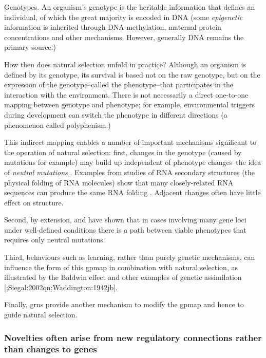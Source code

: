 Genotypes. An organism's \gls{genotype} is the heritable information
that defines an individual, of which the great majority is encoded in
DNA (some \emph{epigenetic} information is inherited through
DNA-methylation, maternal protein concentrations and other mechanisms.
However, generally DNA remains the primary source.)

How then does natural selection unfold in practice? Although an organism
is defined by its genotype, its survival is based not on the raw
genotype, but on the expression of the genotype--called the
\gls{phenotype}--that participates in the interaction with the
environment. There is not necessarily a direct one-to-one mapping
between genotype and phenotype; for example, environmental triggers
during development can switch the phenotype in different directions (a
phenomenon called \gls{polyphenism}.)

This indirect mapping enables a number of important mechanisms
significant to the operation of natural selection: first, changes in the
genotype (caused by mutations for example) may build up independent of
phenotype changes--the idea of \emph{neutral mutations}
\autocite{Ohta:1996vn,Ohta:2002ys,Ohta:1973kx}. Examples from studies
of RNA secondary structures (the physical folding of RNA molecules) show
that many closely-related RNA sequences can produce the same RNA folding
\autocite{Fontana:1993zn}. Adjacent changes often have little effect on
structure.

Second, by extension, \autocite{Gavrilets:1997qt} and
\autocite{Gravner:2007yd} have shown that in cases involving many gene
loci under well-defined conditions there is a path between viable
phenotypes that requires only neutral mutations.

Third, behaviours such as learning, rather than purely genetic
mechanisms, can influence the form of this \gls{gpmap} in combination
with natural selection, as illustrated by the Baldwin effect
\autocite{Baldwin:1896ly} and other examples of genetic assimilation
{[}\autocite{Hinton:1987vy};Siegal:2002qn;Waddington:1942jb{]}.

Finally, \glspl{grn} provide another mechanism to modify the \gls{gpmap}
and hence to guide natural selection.

\subsubsection{Novelties often arise from new regulatory connections rather than changes to genes}
\label{novelties-often-arise-from-new-regulatory-connections-rather-than-changes-to-genes}

